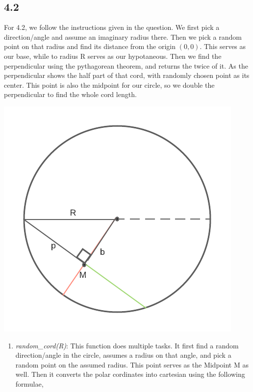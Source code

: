 \documentclass[answers]{exam}
\begin{document}
    \subsection*{4.2}
    \begin{framed}
        For 4.2, we follow the instructions given in the question. We first pick a direction/angle and assume an imaginary radius there. Then we pick a random point on that radius and find its distance from the origin $(0,0)$. This serves as our base, while to radius R serves as our hypotaneous. Then we find the perpendicular using the pythagorean theorem, and returns the twice of it. As the perpendicular shows the half part of that cord, with randomly chosen point as its center. This point is also the midpoint for our circle, so we double the perpendicular to find the whole cord length.
        \begin{center}
            \includegraphics[scale=0.7]{Q4/4.2_circle.png}
        \end{center}
        \begin{enumerate}
            \item \emph{random\_cord(R)}: This function does multiple tasks. It first find a random direction/angle in the circle, assumes a radius on that angle, and pick a random point on the assumed radius. This point serves as the Midpoint M as well. Then it converts the polar cordinates into cartesian using the following formulae,
                \begin{align*}

\end{align*}
\end{enumerate}
\end{framed}
\end{document}
